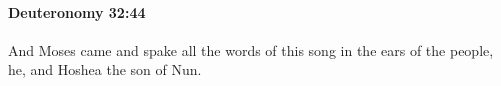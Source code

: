 
		\paragraph{Deuteronomy 32:44} %
			\label{DEUTERONOMY-32-44}

			And Moses came and spake all the words of this song in the ears of the people, he, and Hoshea the son of Nun.


